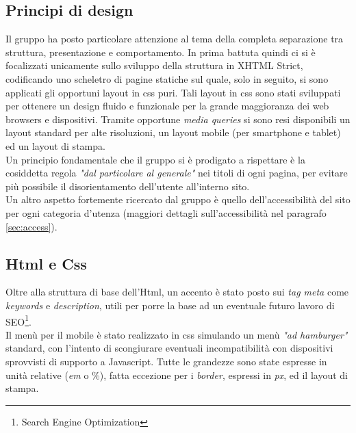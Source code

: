 \subsection{Principi di design}
Il gruppo ha posto particolare attenzione al tema della completa separazione tra struttura, presentazione e comportamento. In prima battuta quindi ci si è focalizzati unicamente sullo sviluppo della struttura in XHTML Strict, codificando uno scheletro di pagine statiche sul quale, solo in seguito, si sono applicati gli opportuni layout in css puri. Tali layout in css sono stati sviluppati per ottenere un design fluido e funzionale per la grande maggioranza dei web browsers e dispositivi. Tramite opportune \emph{media queries} si sono resi disponibili un layout standard per alte risoluzioni, un layout mobile (per smartphone e tablet) ed un layout di stampa. \\
Un principio fondamentale che il gruppo si è prodigato a rispettare è la cosiddetta regola \emph{"dal particolare al generale"} nei titoli di ogni pagina, per evitare più possibile il disorientamento dell'utente all'interno sito.\\
Un altro aspetto fortemente ricercato dal gruppo è quello dell'accessibilità del sito per ogni categoria d'utenza (maggiori dettagli sull'accessibilità nel paragrafo \ref{sec:access}).

\pagebreak

\subsection{Html e Css}
Oltre alla struttura di base dell'Html, un accento è stato posto sui \emph{tag meta} come \emph{keywords} e \emph{description}, utili per porre la base ad un eventuale futuro lavoro di SEO\footnote{Search Engine Optimization}. \\
Il menù per il mobile è stato realizzato in css simulando un menù \emph{"ad hamburger"} standard, con l'intento di scongiurare eventuali incompatibilità con dispositivi sprovvisti di supporto a Javascript. Tutte le grandezze sono state espresse in unità relative (\emph{em} o \%), fatta eccezione per i \emph{border}, espressi in \emph{px}, ed il layout di stampa.


